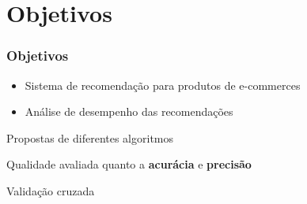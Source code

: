\section[Objetivos]{Objetivos}
\begin{frame}
\frametitle{Objetivos}
\begin{itemize}
	\item Sistema de recomendação para produtos de e-commerces
	\item Análise de desempenho das recomendações
\end{itemize}

Propostas de diferentes algoritmos

Qualidade avaliada quanto a \textbf{acurácia} e \textbf{precisão}

Validação cruzada
\end{frame}
